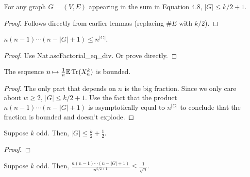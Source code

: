 \begin{lemma}
  \label{lemma:vertex_bound}
  \notready
  For any graph $G = (V, E)$ appearing in the sum in Equation 4.8, $|G| \le k/2 + 1$.
\end{lemma}

\begin{proof}
  \notready
  Follows directly from earlier lemmas (replacing $\#E$ with $k/2$).
\end{proof}



\begin{lemma}
  \label{lemma:asc_factorial_product}
  \notready
  $n(n-1)\cdots (n-|G|+1) \le n^{|G|}$.

\end{lemma}

\begin{proof}
  \notready
  Use Nat.ascFactorial\_eq\_div. Or prove directly.
\end{proof}



\begin{lemma}
  \label{lemma:bounded_map}
  \notready
  The sequence $n\mapsto \frac1n\mathbb{E}\operatorname{Tr}(X_n^k)$ is bounded.
\end{lemma}

\begin{proof}
  \notready
  The only part that depends on $n$ is the big fraction. Since we only care about $w \ge 2$, $|G| \le k/2 + 1$. Use the fact that the product $n(n-1)\cdots (n-|G|+1)$ is asymptotically equal to $n^{|G|}$ to conclude that the fraction is bounded and doesn't explode.
\end{proof}

\begin{lemma}
  \label{lemma:odd_vertex_bound}
  \notready
  Suppose $k$ odd. Then, $|G| \le \frac{k}{2} + \frac{1}{2}$.
\end{lemma}

\begin{proof}
  \notready
\end{proof}

\begin{lemma}
  \label{lemma:odd_ratio_bound}
  \notready
  Suppose $k$ odd. Then, $\frac{n(n-1)\cdots(n-|G|+1)}{n^{k/2+1}} \le \frac{1}{\sqrt{n}}$.
\end{lemma}

